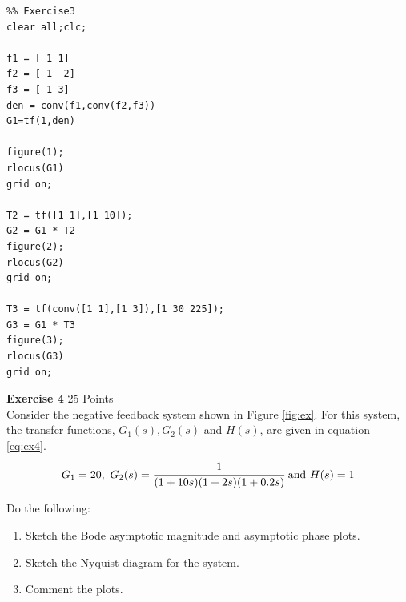 \documentclass[a4paper,11pt]{article}
\begin{document}
\begin{lstlisting}
%% Exercise3
clear all;clc;

f1 = [ 1 1]
f2 = [ 1 -2]
f3 = [ 1 3]
den = conv(f1,conv(f2,f3))
G1=tf(1,den)

figure(1);
rlocus(G1)
grid on;

T2 = tf([1 1],[1 10]);
G2 = G1 * T2
figure(2);
rlocus(G2)
grid on;

T3 = tf(conv([1 1],[1 3]),[1 30 225]);
G3 = G1 * T3
figure(3);
rlocus(G3)
grid on;
\end{lstlisting}
\vskip1cm

{\Large \noindent \bf Exercise 4} \hfill					25 Points\\

\noindent Consider the negative feedback system shown in Figure \ref{fig:ex}. For this system, the transfer functions, $G_1(s), G_2(s)$ and $H(s)$, are given in equation \ref{eq:ex4}.
\begin{equation}
G_1=20, \ G_2(s)=\cfrac{1}{(1+10s)(1+2s)(1+0.2s)} \ \text{and} \ H(s)=1
\label{eq:ex4}
\end{equation} 

\noindent Do the following:
\begin{enumerate}
\item Sketch the Bode asymptotic magnitude and asymptotic phase plots.
\item Sketch the Nyquist diagram for the system.
\item Comment the plots.
\end{enumerate}
\end{document}
